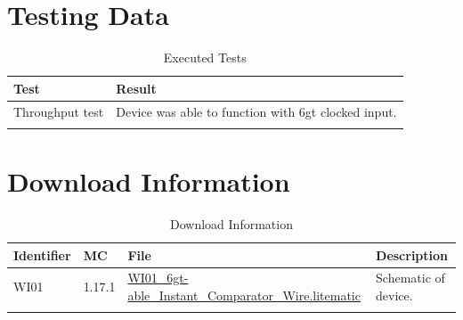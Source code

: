 \documentclass[10pt]{datasheet}
\begin{document}
\section{Testing Data}
\begin{table}[h]
\caption{Executed Tests}
\begin{tabularx}{\textwidth}{l | X}
    \thickhline
    \textbf{Test} & \textbf{Result} \\
    \hline
    Throughput test & Device was able to function with 6gt clocked input. \\
    \thickhline
\end{tabularx}
\end{table}

\section{Download Information}
\begin{table}[h]
    \caption{Download Information}
    \begin{tabularx}{\textwidth}{l | l | l | X}
        \thickhline
        \textbf{Identifier} & \textbf{MC} & \textbf{File} & \textbf{Description} \\
        \hline
        WI01 & 1.17.1 & \href{https://github.com/Soontech-Annals/Archive/blob/8413f90a054b6c415703bae02badeba7541344f6/Archive/wiring/WI01\%206gt-able\%20Instant\%20Comparator\%20Wire/WI01\_6gt-able\_Instant\_Comparator\_Wire.litematic?raw=1}{WI01\_6gt-able\_Instant\_Comparator\_Wire.litematic} & Schematic of device. \\
        \hline
        \thickhline
    \end{tabularx}
\end{table}
\end{document}
